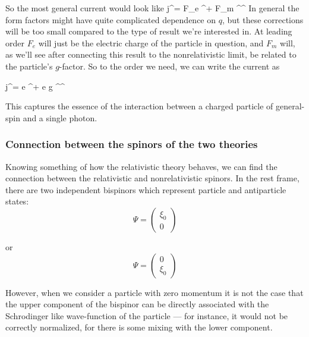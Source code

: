 So the most general current would look like
\beq \label{eq:khr_current}
	j^\mu = F_e  \Psibar^\dagger \Psi + F_m 	 \Psibar^\dagger \TensBi^{\mu\nu} \Psi	
\eeq
In general the form factors might have quite complicated dependence on $q$, but these corrections will be too small compared to the type of result we're interested in.  At leading order $F_e$ will just be the electric charge of the particle in question, and $F_m$ will, as we'll see after connecting this result to the nonrelativistic limit, be related to the particle's $g$-factor.  So to the order we need, we can write the current as

\beq 
	j^\mu =  e  \Psibar^\dagger \Psi +   e g  \Psibar^\dagger \TensBi^{\mu\nu} \Psi
\eeq


This captures the essence of the interaction between a charged particle of general-spin and a single photon.




\subsubsection{Connection between the spinors of the two theories}
Knowing something of how the relativistic theory behaves, we can find the connection between the relativistic and nonrelativistic spinors.  In the rest frame, there are two independent bispinors which represent particle and antiparticle states: 
\[
	\Psi = \begin{pmatrix} \xi_0 \\ 0 \end{pmatrix}
\]

or
\[
	\Psi = \begin{pmatrix} 0 \\ \xi_0 \end{pmatrix}
\]

However, when we consider a particle with zero momentum it is not the case that the upper component of the bispinor can be directly associated with the Schrodinger like wave-function of the particle --- for instance, it would not be correctly normalized, for there is some mixing with the lower component.

